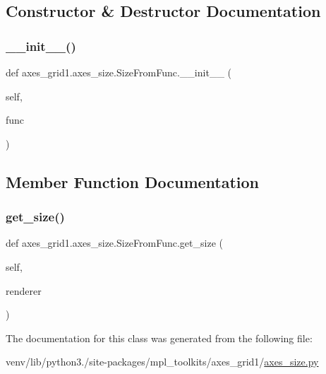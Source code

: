\subsection{Constructor \& Destructor Documentation}
\mbox{\label{classaxes__grid1_1_1axes__size_1_1SizeFromFunc_aeb4360cb7f5093e794b4c689eb7862f0}} 
\subsubsection{\texorpdfstring{\+\_\+\+\_\+init\+\_\+\+\_\+()}{\_\_init\_\_()}}
{\footnotesize\ttfamily def axes\+\_\+grid1.\+axes\+\_\+size.\+Size\+From\+Func.\+\_\+\+\_\+init\+\_\+\+\_\+ (\begin{DoxyParamCaption}\item[{}]{self,  }\item[{}]{func }\end{DoxyParamCaption})}



\subsection{Member Function Documentation}
\mbox{\label{classaxes__grid1_1_1axes__size_1_1SizeFromFunc_a52e9756e195f73e32f2a7b3300221cfe}} 
\subsubsection{\texorpdfstring{get\+\_\+size()}{get\_size()}}
{\footnotesize\ttfamily def axes\+\_\+grid1.\+axes\+\_\+size.\+Size\+From\+Func.\+get\+\_\+size (\begin{DoxyParamCaption}\item[{}]{self,  }\item[{}]{renderer }\end{DoxyParamCaption})}



The documentation for this class was generated from the following file\+:\begin{DoxyCompactItemize}
\item 
venv/lib/python3./site-\/packages/mpl\+\_\+toolkits/axes\+\_\+grid1/\hyperlink{_2axes__size_8py}{axes\+\_\+size.\+py}\end{DoxyCompactItemize}
